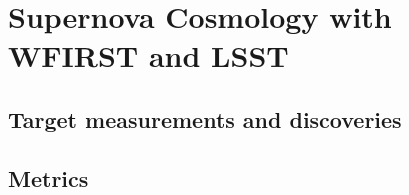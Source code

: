 %
%

\section{Supernova Cosmology with WFIRST and LSST}
\def\secname{\chpname:supernovae}\label{sec:\secname}


%


\subsection{Target measurements and discoveries}
\label{sec:\secname:targets}

%



\subsection{Metrics}
\label{sec:\secname:metrics}

